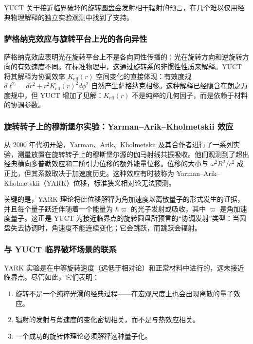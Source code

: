 \documentclass[12pt,a4paper]{article}
\begin{document}
	YUCT 关于接近临界破坏的旋转圆盘会发射相干辐射的预言，在几个难以仅用经典物理解释的独立实验观测中找到了支持。
	
	\subsubsection{萨格纳克效应与旋转平台上光的各向异性}
	
	萨格纳克效应表明光在旋转平台上不是各向同性传播的：光在旋转方向和逆旋转方向的有效速度不同。在标准物理中，这通过旋转系的非惯性性质来解释。YUCT 将其解释为协调效率 \(K_{\mathrm{eff}}(r)\) 空间变化的直接体现：有效度规 \(d\ell^2 = dr^2 + r^2 K_{\mathrm{eff}}(r)^2 d\phi^2\) 自然产生萨格纳克相移。这种解释已经隐含在朗之万度规中，但 YUCT 增加了见解：\(K_{\mathrm{eff}}(r)\) 不是纯粹的几何因子，而是依赖于材料的协调参数。
	
	\subsubsection{旋转转子上的穆斯堡尔实验：Yarman–Arik–Kholmetskii 效应}
	
	从 2000 年代初开始，Yarman、Arik、Kholmetskii 及其合作者进行了一系列实验，测量放置在旋转转子上的穆斯堡尔源的伽马射线共振吸收。他们观测到了超出经典横向多普勒效应和二阶引力位移的额外能量位移。位移的大小与 \(\omega^2 R^2 / c^2\) 成正比，但其系数取决于加速度历史。这种效应有时被称为 Yarman–Arik–Kholmetskii（YARK）位移，标准狭义相对论无法预测。
	
	关键的是，YARK 理论将此位移解释为角加速度以离散量子的形式发生的证据，并且每个量子跃迁伴随着一个能量为 \(\hbar \varpi\) 的光子发射或吸收，其中 \(\varpi\) 是角加速度量子。这正是 YUCT 为接近临界点的旋转圆盘所预言的“协调发射”类型：当圆盘失去协调时，角速度不能连续变化；它会跳跃，而跳跃会辐射。
	
	\subsubsection{与 YUCT 临界破坏场景的联系}
	
	YARK 实验是在中等旋转速度（远低于相对论）和正常材料中进行的，远未接近临界点。尽管如此，它们表明：
	
	\begin{enumerate}
		\item 旋转不是一个纯粹光滑的经典过程——在宏观尺度上也会出现离散的量子效应。
		\item 辐射的发射与角速度的变化密切相关，而不是与热效应相关。
		\item 一个成功的旋转体理论必须解释这种量子化。
	\end{enumerate}
	
\end{document}
